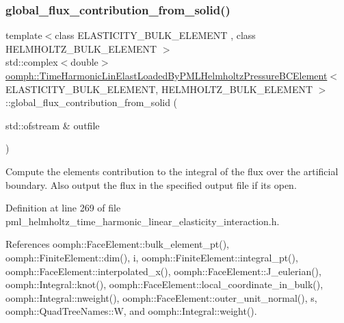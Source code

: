\subsubsection{\texorpdfstring{global\+\_\+flux\+\_\+contribution\+\_\+from\+\_\+solid()}{global\_flux\_contribution\_from\_solid()}\hspace{0.1cm}{\footnotesize\ttfamily [2/2]}}
{\footnotesize\ttfamily template$<$class E\+L\+A\+S\+T\+I\+C\+I\+T\+Y\+\_\+\+B\+U\+L\+K\+\_\+\+E\+L\+E\+M\+E\+NT , class H\+E\+L\+M\+H\+O\+L\+T\+Z\+\_\+\+B\+U\+L\+K\+\_\+\+E\+L\+E\+M\+E\+NT $>$ \\
std\+::complex$<$double$>$ \hyperlink{classoomph_1_1TimeHarmonicLinElastLoadedByPMLHelmholtzPressureBCElement}{oomph\+::\+Time\+Harmonic\+Lin\+Elast\+Loaded\+By\+P\+M\+L\+Helmholtz\+Pressure\+B\+C\+Element}$<$ E\+L\+A\+S\+T\+I\+C\+I\+T\+Y\+\_\+\+B\+U\+L\+K\+\_\+\+E\+L\+E\+M\+E\+NT, H\+E\+L\+M\+H\+O\+L\+T\+Z\+\_\+\+B\+U\+L\+K\+\_\+\+E\+L\+E\+M\+E\+NT $>$\+::global\+\_\+flux\+\_\+contribution\+\_\+from\+\_\+solid (\begin{DoxyParamCaption}\item[{std\+::ofstream \&}]{outfile }\end{DoxyParamCaption})\hspace{0.3cm}{\ttfamily [inline]}}



Compute the element\textquotesingle{}s contribution to the integral of the flux over the artificial boundary. Also output the flux in the specified output file if it\textquotesingle{}s open. 



Definition at line 269 of file pml\+\_\+helmholtz\+\_\+time\+\_\+harmonic\+\_\+linear\+\_\+elasticity\+\_\+interaction.\+h.



References oomph\+::\+Face\+Element\+::bulk\+\_\+element\+\_\+pt(), oomph\+::\+Finite\+Element\+::dim(), i, oomph\+::\+Finite\+Element\+::integral\+\_\+pt(), oomph\+::\+Face\+Element\+::interpolated\+\_\+x(), oomph\+::\+Face\+Element\+::\+J\+\_\+eulerian(), oomph\+::\+Integral\+::knot(), oomph\+::\+Face\+Element\+::local\+\_\+coordinate\+\_\+in\+\_\+bulk(), oomph\+::\+Integral\+::nweight(), oomph\+::\+Face\+Element\+::outer\+\_\+unit\+\_\+normal(), s, oomph\+::\+Quad\+Tree\+Names\+::W, and oomph\+::\+Integral\+::weight().

\mbox{\label{classoomph_1_1TimeHarmonicLinElastLoadedByPMLHelmholtzPressureBCElement_af349037cacaedb53f60de79415b83ac2}} 
